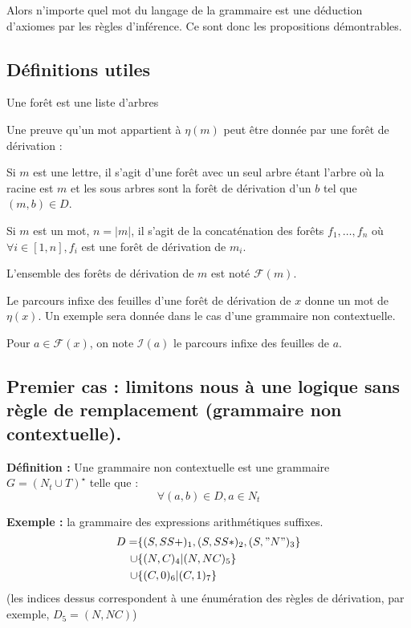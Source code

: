 \documentclass[a4paper,10pt]{article}
\begin{document}
Alors n'importe quel mot du langage de la grammaire est une déduction d'axiomes par les règles d'inférence.
Ce sont donc les propositions démontrables.

\subsection{Définitions utiles}

Une forêt est une liste d'arbres

Une preuve qu'un mot appartient à $\eta(m)$ peut être donnée par une forêt de dérivation :

Si $m$ est une lettre, il s'agit d'une forêt avec un seul arbre étant l'arbre où la racine est $m$ et les sous arbres sont la forêt de dérivation d'un $b$ tel que $(m,b) \in D$.

Si $m$ est un mot, $n = |m|$, il s'agit de la concaténation des forêts $f_1, \dots, f_n$ où $\forall i \in [1,n], f_i$ est une forêt de dérivation de $m_i$.

L'ensemble des forêts de dérivation de $m$ est noté $\mathcal{F}(m)$.

Le parcours infixe des feuilles d'une forêt de dérivation de $x$ donne un mot de $\eta(x)$.
Un exemple sera donnée dans le cas d'une grammaire non contextuelle.

Pour $a \in \mathcal{F}(x)$, on note $\mathcal{I}(a)$ le parcours infixe des feuilles de $a$. 

\subsection{Premier cas : limitons nous à une logique sans règle de remplacement (grammaire non contextuelle).}

\textbf{  Définition : } Une grammaire non contextuelle est une grammaire $G = \left(N_t \cup T\right)^\star$ telle que :
\begin{equation*} \forall (a,b) \in D, a \in N_t  \end{equation*}

\textbf{ Exemple : } la grammaire des expressions arithmétiques suffixes.
\begin{align*}
D = &\{(S,SS+)_1,(S,SS*)_2,(S,"N")_3\}\\
\cup&\{(N,C)_4 | (N,NC)_5\}\\
\cup&\{(C,0)_6 | (C,1)_7\}
\end{align*}
(les indices dessus correspondent à une énumération des règles de dérivation, par exemple, $D_5 = (N,NC)$)
\end{document}
